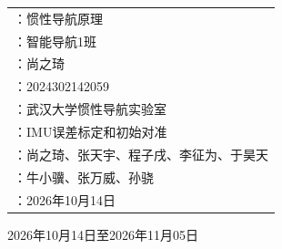 \begin{center}
	{\fontsize{16pt}{18pt}\selectfont
	\begin{tabular}{@{\hspace{4em}}l}
		\makebox[5em][s]{课程名称}：惯性导航原理 \\[0.5cm]
		\makebox[5em][s]{班级}：智能导航1班 \\[0.5cm]
		\makebox[5em][s]{姓名}：尚之琦 \\[0.5cm]
		\makebox[5em][s]{学号}：2024302142059 \\[0.5cm]
		\makebox[5em][s]{实验地点}：武汉大学惯性导航实验室 \\[0.5cm]
		\makebox[5em][s]{实验名称}：IMU误差标定和初始对准 \\[0.5cm]
		\makebox[5em][s]{小组成员}：尚之琦、张天宇、程子戌、李征为、于昊天 \\[0.5cm]
		\makebox[5em][s]{指导教师}：牛小骥、张万威、孙骁 \\[0.5cm]
		\makebox[5em][s]{实验时间}：2026年10月14日
	\end{tabular}}
\end{center}


\vfill
\begin{center}
	{\fontsize{18pt}{20pt}\selectfont {}\selectfont 2026年10月14日至2026年11月05日} \\
\end{center}

\newpage
\mbox{}  %

